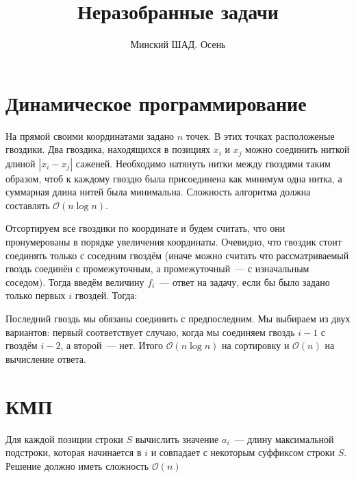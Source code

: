 \documentclass[addpoints]{exam}
\title{Неразобранные задачи}
\author{Минский ШАД. Осень}
\begin{document}
\printanswers
\maketitle

\begin{questions}

\section{Динамическое программирование}

\question[1] На прямой своими координатами задано $n$ точек. В этих точках расположеные гвоздики. Два гвоздика, находящихся в позициях $x_i$ и $x_j$ можно соединить ниткой длиной $|x_i - x_j|$ саженей. Необходимо натянуть нитки между гвоздями таким образом, чтоб к каждому гвоздю была присоединена как минимум одна нитка, а суммарная длина нитей была минимальна. Сложность алгоритма должна составлять $\mathcal{O}( n \log n)$.

\begin{solution}

Отсортируем все гвоздики по координате и будем считать, что они пронумерованы в порядке увеличения координаты. Очевидно, что гвоздик стоит соединять только с соседним гвоздём (иначе можно считать что рассматриваемый гвоздь соединён с промежуточным, а промежуточный~---  с изначальным соседом). Тогда введём величину $f_i$~--- ответ на задачу, если бы было задано только первых $i$ гвоздей. Тогда:

\begin{center}
\end{center}

Последний гвоздь мы обязаны соединить с предпоследним. Мы выбираем из двух вариантов: первый соответствует случаю, когда мы соединяем гвоздь $i-1$ с гвоздём $i-2$, а второй~--- нет. Итого $\mathcal{O}(n \log{n})$ на сортировку и $\mathcal{O}(n)$ на вычисление ответа.

\end{solution}

\section{КМП}

\question[1] Для каждой позиции строки $S$ вычислить значение $a_i$~--- длину максимальной подстроки, которая начинается в $i$ и совпадает с некоторым суффиксом строки $S$. Решение должно иметь сложность $\mathcal{O}(n)$


\end{questions}
\end{document}
